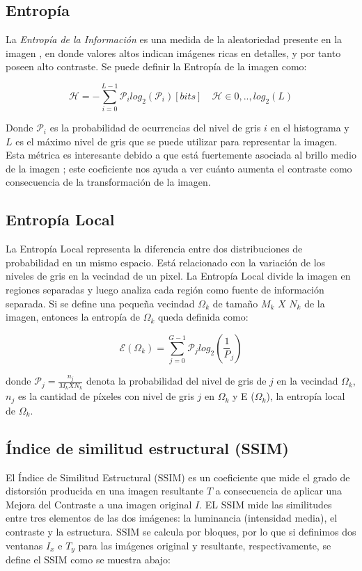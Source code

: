 \documentclass[spanish,twocolumn]{article}
\begin{document}
\subsection{Entropía}
\label{ssec:entropia}

La {\it Entropía de la Información} es una medida de la aleatoriedad presente en la imagen \cite{tsai2008information}, en donde valores altos indican imágenes ricas en detalles, y por tanto poseen alto contraste. Se puede definir la Entropía de la imagen como: 

\begin{equation}\label{eq:entropia}
\mathscr{H}=-\sum_{i=0}^{L-1}\mathcal{P}_i log_2(\mathcal{P}_i) [bits] \quad \mathscr{H} \in {0,..,log_2(L)} 
\end{equation}

Donde $\mathcal{P}_i$ es la probabilidad de ocurrencias del nivel de gris $i$ en el histograma y $L$ es el máximo nivel de gris que se puede utilizar para representar la imagen. Esta métrica es interesante debido a que está fuertemente asociada al brillo medio de la imagen \cite{108593}; este coeficiente nos ayuda a ver cuánto aumenta el contraste como consecuencia de la transformación de la imagen.

\subsection{Entropía Local}
\label{ssec:entropialocal}
La Entropía Local \cite{localentropy} representa la diferencia entre dos distribuciones de probabilidad en un mismo espacio. Está relacionado con la variación de los niveles de gris en la vecindad de un pixel. La Entropía Local divide la imagen en regiones separadas y luego analiza cada región como fuente de información separada.
Si se define una pequeña vecindad $\Omega_k$ de tamaño $M_k$ $X$ $N_k$ de la imagen, entonces la entropía de $\Omega_k$ queda definida como:

\begin{equation}\label{eq:entropialocal}
 \mathscr E{(\Omega_k)}=\sum_{j=0}^{G-1}\mathcal P_j log_2(\frac{1}{P}_j)
\end{equation}

donde $\mathcal P_j=\frac{n_j}{M_k X N_k}$ denota la probabilidad del nivel de gris de $j$ en la vecindad  $\Omega_k$, $n_j$ es la cantidad de píxeles con nivel de gris $j$ en  $\Omega_k$ y E ($\Omega_k$), la entropía local de  $\Omega_k$.

\subsection{Índice de similitud estructural (SSIM)}
\label{ssec:ssim}
El {Índice de Similitud Estructural (SSIM)} \cite{wang2004image} es un coeficiente que mide el grado de distorsión producida en una imagen resultante $T$ a consecuencia de aplicar una Mejora del Contraste a una imagen original $I$. 
EL SSIM mide las similitudes entre tres elementos de las dos imágenes: la luminancia (intensidad media), el contraste y la estructura. SSIM se calcula por bloques, por lo que si definimos dos ventanas $I_x$ e $T_y$ para las imágenes original y resultante, respectivamente, se define el SSIM como se muestra abajo:
\end{document}
